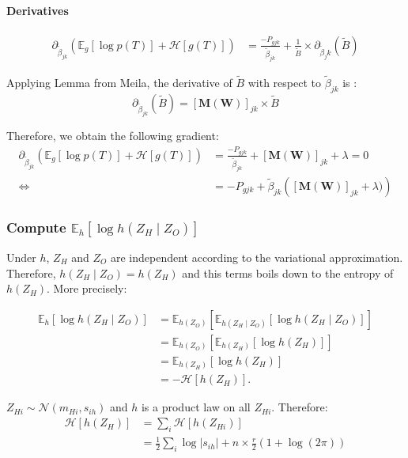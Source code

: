\documentclass[11pt,a4paper]{article}
\newcommand{\Esp}{\mathds{E}}
\newcommand{\entr}{\mathcal{H}}
\begin{document}
\paragraph{Derivatives\\}
\begin{align*}
\partial_{\widetilde{\beta}_{jk}} \left(\Esp_g[\log p(T)] + \entr[g(T)]\right) &= \frac{-P_{gjk}}{\widetilde{\beta}_{jk}} + \frac{1}{\widetilde{B}} \times \partial_{\widetilde{\beta}_jk} (\widetilde{B})
\end{align*}

Applying Lemma from Meila, the derivative of $\widetilde{B}$ with respect to $\widetilde{\beta}_{jk}$ is :
$$\partial_{\widetilde{\beta}_{jk}} (\widetilde{B}) = [\bm{M}(\bm{W})]_{jk} \times \widetilde{B} $$

Therefore, we obtain the following gradient: 
\begin{align*}
\partial_{\widetilde{\beta}_{jk}} \left(\Esp_g[\log p(T)] + \entr[g(T)]\right) &= \frac{-P_{gjk}}{\widetilde{\beta}_{jk}} + [\bm{M}(\bm{W})]_{jk} + \lambda =0\\
\iff &= -P_{gjk}+\widetilde{\beta}_{jk} \left( [\bm{M}(\bm{W})]_{jk} + \lambda)\right)
\end{align*}

\subsubsection{Compute $\Esp_h[\log h(Z_H\mid Z_O)]$}
Under $h$, $Z_H$ and $Z_O$ are independent according to the variational approximation. Therefore, $h(Z_H\mid Z_O) = h(Z_H)$ and this terms boils down to the entropy of $h(Z_H)$. More precisely:

\begin{align*}
\Esp_h[\log h(Z_H\mid Z_O)] &= \Esp_{h(Z_O)}\left[\Esp_{h(Z_H\mid Z_O)}[\log h(Z_H\mid Z_O)]\right]\\
&=\Esp_{h(Z_O)}\left[\Esp_{h(Z_H)}[\log h(Z_H)]\right]\\
&=\Esp_{h(Z_H)}[\log h(Z_H)] \\
&=-\entr[h(Z_H)].
\end{align*}


$Z_{Hi} \sim \mathcal{N}(m_{Hi},s_{ih})$ and $h$ is a product law on all $Z_{Hi}$. Therefore: 
\begin{align*}
\entr[h(Z_H)] &= \sum_i \entr[h(Z_{Hi})] \\
&=\frac{1}{2} \sum_i\log |s_{ih}| +n\times  \frac{r}{2}(1+\log(2\pi))\\
\end{align*}
\end{document}
